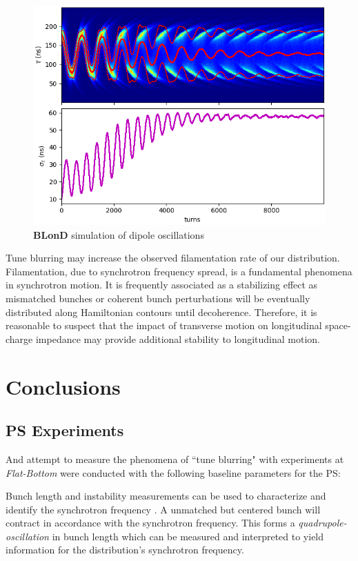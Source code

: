 \begin{figure}
    \centering
    \includegraphics{figs/dipole_oscillation.png}
    \caption{\textbf{BLonD} simulation of dipole oscillations}
    \label{fig:filamentation}
\end{figure}

Tune blurring may increase the observed filamentation rate of our distribution. Filamentation, due to synchrotron frequency spread, is a fundamental phenomena in synchrotron motion. It is frequently associated as a stabilizing effect as mismatched bunches or coherent bunch perturbations will be eventually distributed along Hamiltonian contours until decoherence. Therefore, it is reasonable to suspect that the impact of transverse motion on longitudinal space-charge impedance may provide additional stability to longitudinal motion.

\chapter{Conclusions}

\section{PS Experiments}

And attempt to measure the phenomena of ``tune blurring" with experiments at \textit{Flat-Bottom} were conducted with the following baseline parameters for the PS:



Bunch length and instability measurements can be used to characterize and identify the synchrotron frequency \cite{sacherer_bunch_1977}. A unmatched but centered bunch will contract in accordance with the synchrotron frequency. This forms a \textit{quadrupole-oscillation} in bunch length which can be measured and interpreted to yield information for the distribution's synchrotron frequency.

